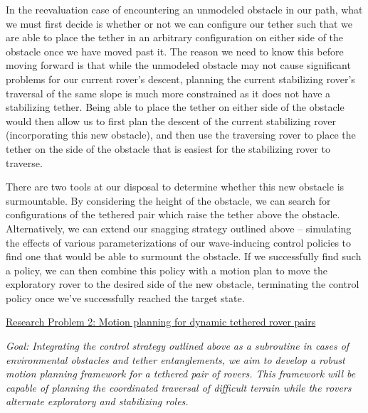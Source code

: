 \documentclass[12pt]{article}
\begin{document}
In the reevaluation case of encountering an unmodeled obstacle in our path, what we must first decide is whether 
or not we can configure our tether such that we are able to place the tether in an arbitrary configuration on either side of the obstacle 
once we have moved past it. The reason we need to know this before moving forward is that while the unmodeled obstacle may not cause 
significant problems for our current rover's descent, planning the current stabilizing rover's traversal of the same slope is much more 
constrained as it does not have a stabilizing tether. Being able to place the tether on either side of the obstacle would then 
allow us to first plan the descent of the current stabilizing rover (incorporating this new obstacle), 
and then use the traversing rover to place the tether on the side of the obstacle that is easiest for the stabilizing rover to traverse. 

There are two tools at our disposal to determine whether this new obstacle is surmountable. By considering the height of the obstacle, 
we can search for configurations of the tethered pair which raise the tether above the obstacle. 
Alternatively, we can extend our snagging strategy outlined above -- simulating the effects of various parameterizations of our 
wave-inducing control policies to find one that would be able to surmount the obstacle. If we successfully find such a policy, we can then 
combine this policy with a motion plan to move the exploratory rover to the desired side of the new obstacle, terminating the control policy 
once we've successfully reached the target state.


\noindent\underline{Research Problem 2: Motion planning for dynamic tethered rover pairs }

{\sl Goal: Integrating the control strategy outlined above as a subroutine in cases of environmental obstacles and tether 
entanglements, we aim to develop a robust motion planning framework for a tethered pair of rovers. This framework will be capable 
of planning the coordinated traversal of difficult terrain while the rovers alternate exploratory and stabilizing roles. }
\end{document}
